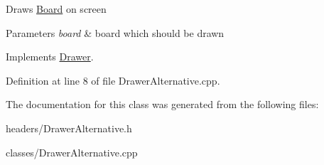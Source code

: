 Draws \hyperlink{classBoard}{Board} on screen 
\begin{DoxyParams}{Parameters}
{\em board} & board which should be drawn \\
\hline
\end{DoxyParams}


Implements \hyperlink{classDrawer_afe75fce45596f02f01514322ebd57c8c}{Drawer}.



Definition at line 8 of file Drawer\+Alternative.\+cpp.



The documentation for this class was generated from the following files\+:\begin{DoxyCompactItemize}
\item 
headers/Drawer\+Alternative.\+h\item 
classes/Drawer\+Alternative.\+cpp\end{DoxyCompactItemize}

